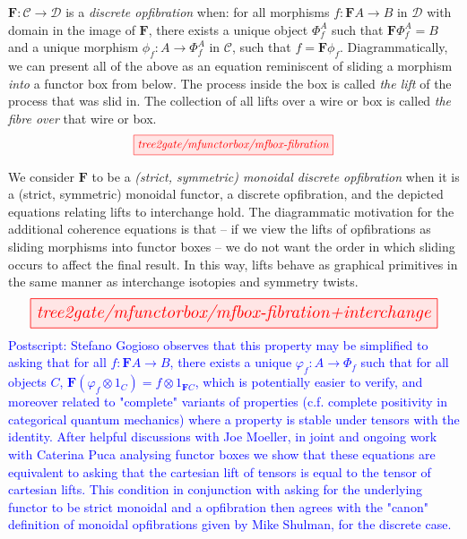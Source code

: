\clearpage

\begin{defn}\label{defn:discopf}
$\mathbf{F}: \mathcal{C} \rightarrow \mathcal{D}$ is a \emph{discrete opfibration} when:
for all morphisms $f: \mathbf{F}A \rightarrow B$ in $\mathcal{D}$ with domain in the image of $\mathbf{F}$, there exists a unique object $\Phi^A_f$ such that $\mathbf{F}\Phi^A_f = B$ and a unique morphism $\phi_f: A \rightarrow \Phi^A_f$ in $\mathcal{C}$, such that $f = \mathbf{F}\phi_f$. Diagrammatically, we can present all of the above as an equation reminiscent of sliding a morphism \emph{into} a functor box from below. The process inside the box is called \emph{the lift} of the process that was slid in. The collection of all lifts over a wire or box is called \emph{the fibre over} that wire or box.
\[\resizebox{0.5\textwidth}{!}{\tikzfig{tree2gate/mfunctorbox/mfbox-fibration}}\]
\end{defn}

\clearpage

\begin{defn}\label{defn:mondiscopf}
We consider $\mathbf{F}$ to be a \emph{(strict, symmetric) monoidal discrete opfibration} when it is a (strict, symmetric) monoidal functor, a discrete opfibration, and the depicted equations relating lifts to interchange hold. The diagrammatic motivation for the additional coherence equations is that -- if we view the lifts of opfibrations as sliding morphisms into functor boxes -- we do not want the order in which sliding occurs to affect the final result. In this way, lifts behave as graphical primitives in the same manner as interchange isotopies and symmetry twists.
\[\resizebox{\textwidth}{!}{\tikzfig{tree2gate/mfunctorbox/mfbox-fibration+interchange}}\]
\textcolor{blue}{Postscript: Stefano Gogioso observes that this property may be simplified to asking that for all $f: \mathbf{F}A \rightarrow B$, there exists a unique $\varphi_f: A \rightarrow \Phi_f$ such that for all objects $C$, $\mathbf{F}(\varphi_f \otimes 1_C) = f \otimes 1_{\mathbf{F}C}$, which is potentially easier to verify, and moreover related to "complete" variants of properties (c.f. complete positivity in categorical quantum mechanics) where a property is stable under tensors with the identity. After helpful discussions with Joe Moeller, in joint and ongoing work with Caterina Puca analysing functor boxes we show that these equations are equivalent to asking that the cartesian lift of tensors is equal to the tensor of cartesian lifts. This condition in conjunction with asking for the underlying functor to be strict monoidal and a opfibration then agrees with the "canon" definition of monoidal opfibrations given by Mike Shulman, for the discrete case.}
\end{defn}


